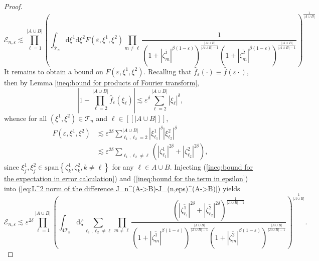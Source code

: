 \documentclass[10pt,a4paper]{amsart}
\newcommand{\1}{\mathds{1}}
\renewcommand{\d}{\mathrm d}
\numberwithin{equation}{section}
\begin{document}
\begin{proof}
    \begin{equation*}
        \mathcal E_{n,\varepsilon}\lesssim\prod_{\ell=1}^{|A\cup B|}\left(\int_{\mathcal T_n}\d\xi^1\d\xi^2 F(\varepsilon,\xi^1,\xi^2)\prod_{m\ne \ell}\frac{1}{\left(1+|\overline{\zeta_m^1}|^{\beta(1-\varepsilon)}\right)^{\frac{|A\cup B|}{|A\cup B|-1}}\left(1+|\overline{\zeta_m^2}|^{\beta(1-\varepsilon)}\right)^\frac{|A\cup B|}{|A\cup B|-1}}\right)^{\frac{1}{|A\cup B|}}
    \end{equation*}
    It remains to obtain a bound on $F(\varepsilon,\xi^1,\xi^2)$. Recalling that $\hat f_\varepsilon(\cdot)\equiv\hat f(\varepsilon\cdot)$, then by Lemma \ref{ineq:bound for products of Fourier transform},
    \begin{equation*}
        \left|1-\prod_{\ell=2}^{|A\cup B|}\hat f_{\varepsilon}\left(\xi_\ell\right)\right|\lesssim \varepsilon^\delta\sum_{\ell=2}^{|A\cup B|}|\xi_\ell|^\delta,
    \end{equation*}
    whence for all $(\xi^1,\xi^2)\in\mathcal T_n$ and $\ell\in[\![|A\cup B|]\!]$,
    \begin{align}
    \label{ineq:bound for the term in epsilon}
        F(\varepsilon,\xi^1,\xi^2)&\lesssim\varepsilon^{2\delta}\sum_{\ell_1,\ell_2=2}^{|A\cup B|}|\xi_{\ell_1}^1|^\delta|\xi_{\ell_2}^2|^\delta\nonumber\\
        &\lesssim\varepsilon^{2\delta}\sum_{\ell_1,\ell_2\ne \ell}\left(|\zeta_{\ell_1}^1|^{2\delta}+|\zeta_{\ell_2}^2|^{2\delta}\right),
    \end{align}
    since $\xi_j^1,\xi_j^2\in\mathrm{span}\left\{\zeta_k^1,\zeta_k^2, k\ne \ell\right\}$ for any $\ell\in A\cup B$. Injecting (\ref{ineq:bound for the expectation in error calculation}) and (\ref{ineq:bound for the term in epsilon}) into (\ref{eq:L^2 norm of the difference J_n^(A->B)-J_(n,eps)^(A->B)}) yields
    \begin{equation}
    \label{ineq:final bound for E_(n,varepsilon)}
        \mathcal E_{n,\varepsilon}\lesssim \varepsilon^{2\delta}\prod_{\ell=1}^{|A\cup B|}\left(\int_{4\mathcal T_n}\d\zeta \sum_{\ell_1,\ell_2\ne \ell}\prod_{m\ne \ell}\frac{\left(|\overline{\zeta_{\ell_1}^1}|^{2\delta}+|\overline{\zeta_{\ell_2}^2}|^{2\delta}\right)^{\frac{1}{|A\cup B|-1}}}{\left(1+|\overline{\zeta_m^1}|^{\beta(1-\varepsilon)}\right)^{\frac{|A\cup B|}{|A\cup B|-1}}\left(1+|\overline{\zeta_m^2}|^{\beta(1-\varepsilon)}\right)^\frac{|A\cup B|}{|A\cup B|-1}}\right)^{\frac{1}{|A\cup B|}}.
    \end{equation}
    

\end{proof}
\end{document}
